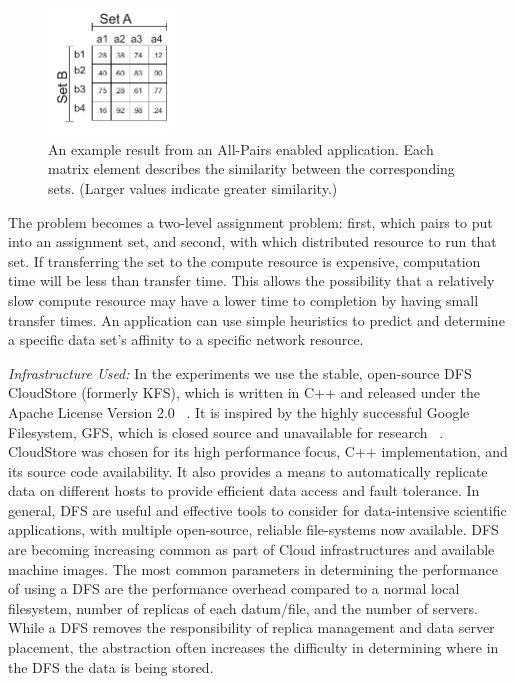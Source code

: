 \documentclass{rspublic}
\begin{document}
\begin{figure}[!ht]
 \begin{center}
     \includegraphics[width=0.3\textwidth]{data/allpairs-exp.pdf}
\end{center}
\caption{\small An example result from an All-Pairs enabled application.
Each matrix element describes the similarity between the corresponding
sets. (Larger values indicate greater similarity.)}
 \label{Fig:AllPairsExplanation}
\end{figure}

The problem becomes a two-level assignment problem: first, which pairs
to put into an assignment set, and second, with which distributed
resource to run that set. If transferring the set to the compute
resource is expensive, computation time will be less than transfer time.
This allows the possibility that a relatively slow compute resource may
have a lower time to completion by having small transfer times. An
application can use simple heuristics to predict and determine a
specific data set's affinity to a specific network resource.


{\it Infrastructure Used: } In the experiments we use the stable,
open-source DFS CloudStore (formerly KFS), which is written in C++ and
released under the Apache License Version 2.0 ~\citep{cloudstore_web}.
It is inspired by the highly successful Google Filesystem, GFS, which
is closed source and unavailable for research ~\citep{GFS}. CloudStore
was chosen for its high performance focus, C++ implementation, and its
source code availability. It also provides a means to automatically
replicate data on different hosts to provide efficient data access and
fault tolerance. In general, DFS are useful and effective tools to
consider for data-intensive scientific applications, with multiple
open-source, reliable file-systems now available. DFS are becoming
increasing common as part of Cloud infrastructures and available
machine images. The most common parameters in determining the
performance of using a DFS are the performance overhead compared to a
normal local filesystem, number of replicas of each datum/file, and
the number of servers. While a DFS removes the responsibility of
replica management and data server placement, the abstraction often
increases the difficulty in determining where in the DFS the data is
being stored.
\end{document}
